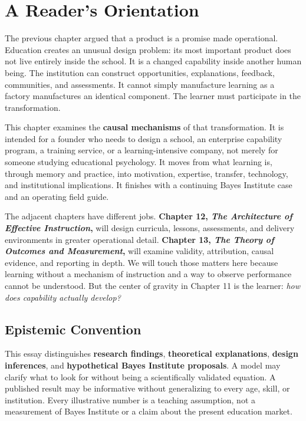 \section*{A Reader's Orientation}

The previous chapter argued that a product is a promise made operational. Education creates an unusual design problem: its most important product does not live entirely inside the school. It is a changed capability inside another human being. The institution can construct opportunities, explanations, feedback, communities, and assessments. It cannot simply manufacture learning as a factory manufactures an identical component. The learner must participate in the transformation.

This chapter examines the \textbf{causal mechanisms} of that transformation. It is intended for a founder who needs to design a school, an enterprise capability program, a training service, or a learning-intensive company, not merely for someone studying educational psychology. It moves from what learning is, through memory and practice, into motivation, expertise, transfer, technology, and institutional implications. It finishes with a continuing Bayes Institute case and an operating field guide.

The adjacent chapters have different jobs. \textbf{Chapter 12, \emph{The Architecture of Effective Instruction},} will design curricula, lessons, assessments, and delivery environments in greater operational detail. \textbf{Chapter 13, \emph{The Theory of Outcomes and Measurement},} will examine validity, attribution, causal evidence, and reporting in depth. We will touch those matters here because learning without a mechanism of instruction and a way to observe performance cannot be understood. But the center of gravity in Chapter 11 is the learner: \emph{how does capability actually develop?}

\subsection*{Epistemic Convention}

This essay distinguishes \textbf{research findings}, \textbf{theoretical explanations}, \textbf{design inferences}, and \textbf{hypothetical Bayes Institute proposals}. A model may clarify what to look for without being a scientifically validated equation. A published result may be informative without generalizing to every age, skill, or institution. Every illustrative number is a teaching assumption, not a measurement of Bayes Institute or a claim about the present education market.

